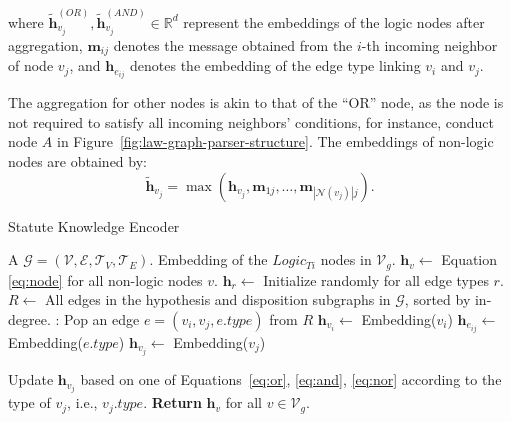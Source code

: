 
\noindent where $\tilde{\mathbf{h}}_{v_j}^{(OR)}, \tilde{\mathbf{h}}_{v_j}^{(AND)} \in \mathbb{R}^{d}$ represent the embeddings of the logic nodes after aggregation, $\mathbf{m}_{ij}$ denotes the message obtained from the $i$-th incoming neighbor of node $v_j$, and $\mathbf{h}_{e_{ij}}$ denotes the embedding of the edge type linking $v_i$ and $v_j$. 

The aggregation for other nodes is akin to that of the ``OR'' node, as the node is not required to satisfy all incoming neighbors' conditions, for instance, conduct node $A$ in Figure~\ref{fig:law-graph-parser-structure}. The embeddings of non-logic nodes are obtained by:
\begin{equation}
\tilde{\mathbf{h}}_{v_j} = \max({\mathbf{h}_{v_j},\mathbf{m}_{1j},\ldots,\mathbf{m}_{|\mathcal{N}(v_j)|j}}).
\label{eq:nor}
\end{equation}

\begin{algorithm}[t]
\caption{Statute Knowledge Encoder}
\label{alg:encoding}
\begin{algorithmic}[1]
\Require A \lawgraph{} $\mathcal{G}=(\mathcal{V}, \mathcal{E}, \mathcal{T}_V, \mathcal{T}_E)$. 
\Ensure Embedding of the $Logic_{Ti}$ nodes in $\mathcal{V}_g$. 
\State $\mathbf{h}_v \gets $ Equation \ref{eq:node} for all non-logic nodes $v$.
\State $\mathbf{h}_r \gets $ Initialize randomly for all edge types $r$.
\State $R \gets$ All edges in the hypothesis and disposition subgraphs in $\mathcal{G}$, sorted by in-degree. 
:
    \State Pop an edge \( e=(v_i, v_j, e.type) \) from \( R \)
    \State \( \mathbf{h}_{v_i} \gets \) Embedding(\( v_i \)) %
    \State \( \mathbf{h}_{e_{ij}} \gets \) Embedding(\(e.type \)) %
    \State \( \mathbf{h}_{v_j} \gets \) Embedding(\( v_j \)) %
    
    \State Update \( \mathbf{h}_{v_j} \) based on one of Equations~\ref{eq:or}, \ref{eq:and}, \ref{eq:nor} according to the type of $v_j$, i.e., $v_j.type$.
\EndWhile
\State \textbf{Return} $\mathbf{h}_{v}$ for all $v\in \mathcal{V}_g$.
\end{algorithmic}
\end{algorithm}



